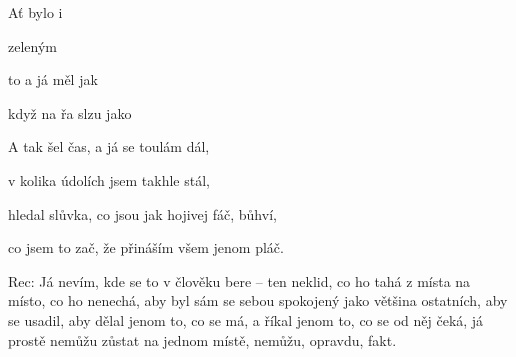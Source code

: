 

\zs
Ať bylo  i     

zeleným    

 to  a já měl  jak 

když na řa slzu  jako   
\ks

\zr
{}
\kr

\zs
A tak šel čas, a já se toulám dál,

v kolika údolích jsem takhle stál,

hledal slůvka, co jsou jak hojivej fáč, bůhví,

co jsem to zač, že přináším všem jenom pláč.
\ks

\zr\kr

Rec: Já nevím, kde se to v člověku bere -- ten neklid, co ho tahá z místa na 
místo, co ho nenechá, aby byl sám se sebou spokojený jako většina ostatních, 
aby se usadil, aby dělal jenom to, co se má, a říkal jenom to, co se od něj 
čeká, já prostě nemůžu zůstat na jednom místě, nemůžu, opravdu, fakt.

\zr\kr

\kp

